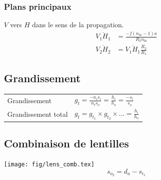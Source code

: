 \subsubsection{Plans principaux}
$V$ vers $H$ dans le sens de la propagation.
\begin{align*}
    \overline{V_1H_1} &= \frac{-f(n_{la}-1)a}{R_2n_{la}}\\
    \overline{V_2H_2} &= \overline{V_1H_1}\frac{R_2}{R_1}
\end{align*}

\subsection{Grandissement}
\begin{tabular}{ll}
    Grandissement &  \(g_t = \frac{-n_i s_i}{n_t s_o} = \frac{h_i}{h_o}=\frac{-s_i}{s_o}\) \\[8pt]
    Grandissement total & \(g_t=g_{t_{1}}\times g_{t_{2}} \times \ldots = \frac{h_i}{h_o}\)
\end{tabular}

\subsection{Combinaison de lentilles}
\centering
\texttt{[image: fig/lens\_comb.tex]}
\[s_{o_2}=d_a-s_{i_1}\]

\raggedright